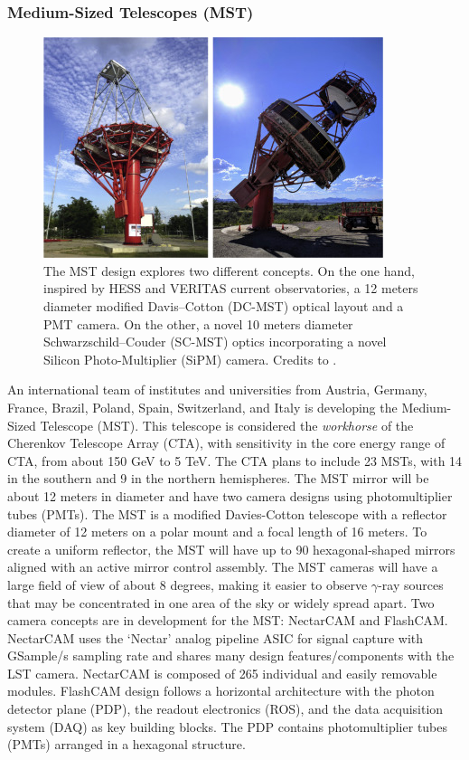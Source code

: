 \subsubsection{Medium-Sized Telescopes (MST)}
\begin{figure}[t]
\centering
\includegraphics[width=0.9\linewidth]{figures/introduction/mst.jpg}
\caption{The MST design explores two different concepts. On the one hand, inspired by HESS and VERITAS current observatories, a 12 meters diameter modified Davis–Cotton (DC-MST) optical layout and a PMT camera. On the other, a novel 10 meters diameter Schwarzschild–Couder (SC-MST) optics incorporating a novel Silicon Photo-Multiplier (SiPM) camera. Credits to \cite{Barrio_2020}.} 
\label{fig:mst}
\end{figure}
An international team of institutes and universities from Austria, Germany, France, Brazil, Poland, Spain, Switzerland, and Italy is developing the Medium-Sized Telescope (MST). This telescope is considered the \textit{workhorse} of the Cherenkov Telescope Array (CTA), with sensitivity in the core energy range of CTA, from about 150 GeV to 5 TeV. The CTA plans to include 23 MSTs, with 14 in the southern and 9 in the northern hemispheres. The MST mirror will be about 12 meters in diameter and have two camera designs using photomultiplier tubes (PMTs).
The MST is a modified Davies-Cotton telescope with a reflector diameter of 12 meters on a polar mount and a focal length of 16 meters. To create a uniform reflector, the MST will have up to 90 hexagonal-shaped mirrors aligned with an active mirror control assembly. The MST cameras will have a large field of view of about 8 degrees, making it easier to observe $\gamma$-ray sources that may be concentrated in one area of the sky or widely spread apart. Two camera concepts are in development for the MST: NectarCAM and FlashCAM. NectarCAM uses the ‘Nectar’ analog pipeline ASIC for signal capture with GSample/s sampling rate and shares many design features/components with the LST camera. NectarCAM is composed of 265 individual and easily removable modules. FlashCAM design follows a horizontal architecture with the photon detector plane (PDP), the readout electronics (ROS), and the data acquisition system (DAQ) as key building blocks. The PDP contains photomultiplier tubes (PMTs) arranged in a hexagonal structure.
